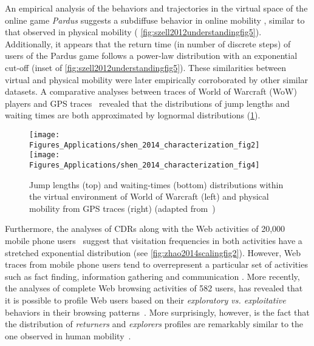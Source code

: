 An empirical analysis of the behaviors and trajectories in the virtual space of the online game \emph{Pardus} suggests a subdiffuse behavior in online mobility \cite{szell_2012_understanding}, similar to that observed in physical mobility \cite{song_2010_modelling,gonzalez_2008_understanding} ( \figurename \ref{fig:szell2012understandingfig5}). Additionally, it appears that the return time (in number of discrete steps) of users of the Pardus game follows a power-law distribution with an exponential cut-off (inset of \figurename \ref{fig:szell2012understandingfig5}).
These similarities between virtual and physical mobility were later empirically corroborated by other similar datasets. A comparative analyses between traces of World of Warcraft (WoW) players and GPS traces~\cite{shen_2014_characterization} revealed that the distributions of  jump lengths and waiting times are both approximated by lognormal distributions (\figurename \ref{fig:shen2014characterizationfig2}). 

\begin{figure}[t!]
\centering
\texttt{[image: Figures\_Applications/shen\_2014\_characterization\_fig2]}\\
\texttt{[image: Figures\_Applications/shen\_2014\_characterization\_fig4]}

\caption{Jump lengths (top) and waiting-times (bottom) distributions within the virtual environment of World of Warcraft (left) and physical mobility from GPS traces (right) (adapted from~\cite{shen_2013_human})}
\label{fig:shen2014characterizationfig2}
\end{figure}

Furthermore, the analyses of CDRs along with the Web activities of 20,000 mobile phone users~\cite{zhao_2014_scaling} suggest that visitation frequencies in both activities have a stretched exponential distribution (see \figurename \ref{fig:zhao2014scalingfig2}). 
However, Web traces from mobile phone users tend to overrepresent a particular set of activities such as fact finding, information gathering and communication \cite{cui_2008_exploring}. More recently, the analyses of complete Web browsing activities of 582 users, has revealed that it is possible to profile Web users based on their \emph{exploratory vs. exploitative} behaviors in their browsing patterns~\cite{barbosa_2016_returners}. More surprisingly, however, is the fact that the distribution of \emph{returners} and \emph{explorers} profiles are remarkably similar to the one observed in human mobility~\cite{pappalardo_2015_returners}.

